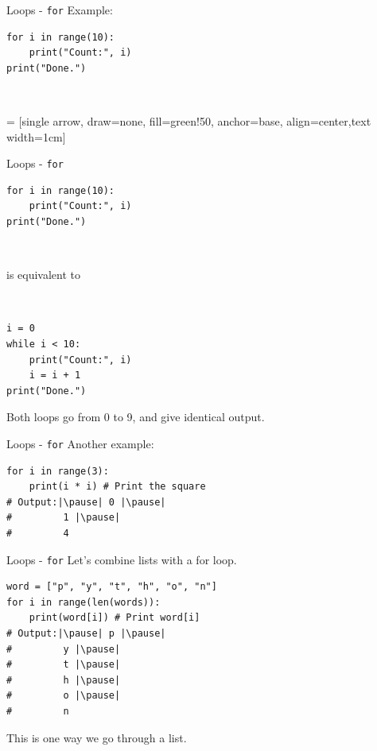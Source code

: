\documentclass[dvipsnames, svgnames, x11names]{beamer}
\begin{document}
\begin{frame}[fragile]{Loops - \texttt{for}}
Example:
\begin{verbatim}
for i in range(10):
    print("Count:", i)
print("Done.")
\end{verbatim}

\ 

 = [single arrow, draw=none, fill=green!50, anchor=base, align=center,text width=1cm]
\end{frame}

\begin{frame}[fragile]{Loops - \texttt{for}}
\begin{verbatim}
for i in range(10):
    print("Count:", i)
print("Done.")
\end{verbatim}

\

is equivalent to

\

\begin{verbatim}
i = 0
while i < 10:
    print("Count:", i)
    i = i + 1
print("Done.")
\end{verbatim}

Both loops go from 0 to 9, and give identical output.
\end{frame}

\begin{frame}[fragile]{Loops - \texttt{for}}
Another example:
\begin{verbatim}
for i in range(3):
    print(i * i) # Print the square
# Output:|\pause| 0 |\pause|
#         1 |\pause|
#         4
\end{verbatim}
\end{frame}

\begin{frame}[fragile]{Loops - \texttt{for}}
Let's combine lists with a for loop.
\begin{verbatim}
word = ["p", "y", "t", "h", "o", "n"]
for i in range(len(words)):
    print(word[i]) # Print word[i]
# Output:|\pause| p |\pause|
#         y |\pause|
#         t |\pause|
#         h |\pause|
#         o |\pause|
#         n
\end{verbatim}
\pause This is one way we go through a list.
\end{frame}
\end{document}

